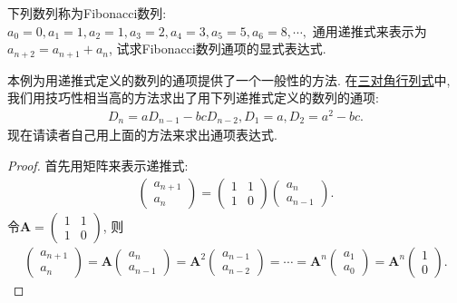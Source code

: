 \documentclass[../../main.tex]{subfiles}%
\begin{document}
\begin{example}
下列数列称为Fibonacci数列:
\(a_{0}=0,a_{1}=1,a_{2}=1,a_{3}=2,a_{4}=3,a_{5}=5,a_{6}=8,\cdots,\)
通用递推式来表示为\(a_{n + 2}=a_{n + 1}+a_{n}\), 试求Fibonacci数列通项的显式表达式.
\end{example}
\begin{remark}
本例为用递推式定义的数列的通项提供了一个一般性的方法. 在\hyperref[三对角行列式]{三对角行列式}中, 我们用技巧性相当高的方法求出了用下列递推式定义的数列的通项:
\begin{align*}
D_{n}=aD_{n - 1}-bcD_{n - 2},D_{1}=a,D_{2}=a^{2}-bc.
\end{align*}
现在请读者自己用上面的方法来求出通项表达式. 
\end{remark}
\begin{proof}
首先用矩阵来表示递推式:
\begin{align*}
\begin{pmatrix}
a_{n + 1}\\
a_{n}
\end{pmatrix}=\begin{pmatrix}
1&1\\
1&0
\end{pmatrix}\begin{pmatrix}
a_{n}\\
a_{n - 1}
\end{pmatrix}.
\end{align*}
令\(\boldsymbol{A}=\begin{pmatrix}
1&1\\
1&0
\end{pmatrix}\), 则
\begin{align*}
\begin{pmatrix}
a_{n + 1}\\
a_{n}
\end{pmatrix}=\boldsymbol{A}\begin{pmatrix}
a_{n}\\
a_{n - 1}
\end{pmatrix}=\boldsymbol{A}^{2}\begin{pmatrix}
a_{n - 1}\\
a_{n - 2}
\end{pmatrix}=\cdots=\boldsymbol{A}^{n}\begin{pmatrix}
a_{1}\\
a_{0}
\end{pmatrix}=\boldsymbol{A}^{n}\begin{pmatrix}
1\\
0
\end{pmatrix}.
\end{align*}

\end{proof}
\end{document}
